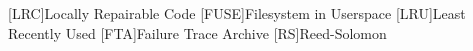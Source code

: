 \begin{acronym}
[LRC]{Locally Repairable Code}
[FUSE]{Filesystem in Userspace}
[LRU]{Least Recently Used}
[FTA]{Failure Trace Archive}
[RS]{Reed-Solomon}
\end{acronym}
